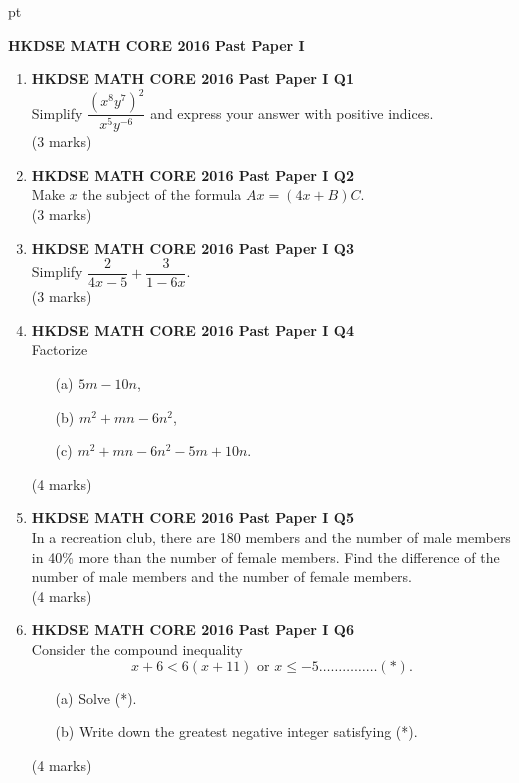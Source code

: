 \documentclass[12pt]{article}
\begin{document}
 pt
\begin{center}
	{\large \bf HKDSE MATH CORE 2016 Past Paper I}\\
	\vspace{2 mm}

\end{center}
\vspace{0.05cm}

\begin{enumerate}
	\item \textbf{HKDSE MATH CORE 2016 Past Paper I Q1}\\
	Simplify $\dfrac{(x^8y^7)^2}{x^5y^{-6}}$ and express your answer with positive indices. \\(3 marks)	
	
	\item \textbf{HKDSE MATH CORE 2016 Past Paper I Q2}\\
	Make $x$ the subject of the formula $Ax = (4x + B)C$. \\(3 marks)

	\item \textbf{HKDSE MATH CORE 2016 Past Paper I Q3}\\
	Simplify $\dfrac{2}{4x - 5} + \dfrac{3}{1-6x}$. \\(3 marks)

	\item \textbf{HKDSE MATH CORE 2016 Past Paper I Q4}\\
	Factorize
	\begin{enumerate}
		\item[(a)] $5m - 10n$,
		\item[(b)] $m^2 + mn - 6n^2$,
		\item[(c)] $m^2 + mn - 6n^2 - 5m + 10n$.
	\end{enumerate}
	(4 marks)

	\item \textbf{HKDSE MATH CORE 2016 Past Paper I Q5}\\
	In a recreation club, there are 180 members and the number of male members in 40\% more than the number of female members. Find the difference of the number of male members and the number of female members. \\(4 marks)
   
	\item \textbf{HKDSE MATH CORE 2016 Past Paper I Q6}\\
	Consider the compound inequality $$x + 6 < 6(x + 11) \text{ or } x \leq -5 \dots\dots\dots\dots\dots (*) .$$
	\begin{enumerate}
		\item[(a)] Solve (*).
		\item[(b)] Write down the greatest negative integer satisfying (*).
	\end{enumerate}
	(4 marks)


\end{enumerate}
\end{document}
